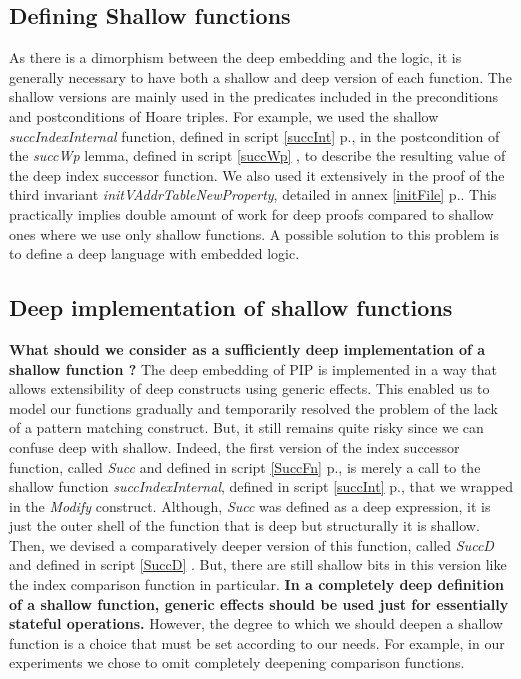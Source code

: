 \subsection{Defining Shallow functions}
As there is a dimorphism  between the deep embedding and the logic, it is generally necessary to have both a shallow and deep version of each function. The shallow versions are mainly used in the predicates included in the preconditions and postconditions of Hoare triples. For example, we used the shallow \textit{succIndexInternal} function, defined in script \ref{succInt} p.\pageref{succInt}, in the postcondition of the \textit{succWp} lemma, defined in script \ref{succWp} \pageref{succWp}, to describe the resulting value of the deep index successor function. We also used it extensively in the proof of the third invariant \textit{initVAddrTableNewProperty}, detailed in annex \ref{initFile} p.\pageref{initFile}. This practically implies double amount of work for deep proofs compared to shallow ones where we use only shallow functions. A possible solution to this problem is to define a deep language with embedded logic\cite{SoftwareFoundation}. 


\subsection{Deep implementation of shallow functions}
\textbf{What should we consider as a sufficiently deep implementation of a shallow function ?} The deep embedding of PIP is implemented in a way that allows extensibility of deep constructs using generic effects. This enabled us to model our functions gradually and temporarily resolved the problem of the lack of a pattern matching construct. But, it still remains quite risky since we can confuse deep with shallow. Indeed, the first version of the index successor function, called \textit{Succ} and defined in script \ref{SuccFn} p.\pageref{SuccFn}, is merely a call to the shallow function \textit{succIndexInternal}, defined in script \ref{succInt} p.\pageref{succInt}, that we wrapped in the \textit{Modify} construct. Although, \textit{Succ} was  defined as a deep expression, it is just the outer shell of the function that is deep but structurally it is shallow. \\

Then, we devised a comparatively deeper version of this function, called \textit{SuccD} and defined in script \ref{SuccD} \pageref{SuccD}. But, there are still shallow bits in this version like the index comparison function in particular. \textbf{In a completely deep definition of a shallow function, generic effects should be used just for essentially stateful operations.} However, the degree  to which we should deepen a shallow function is a choice that must be set according to our needs. For example, in our experiments we chose to omit completely deepening comparison functions.